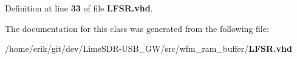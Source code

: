 Definition at line {\bf 33} of file {\bf L\+F\+S\+R.\+vhd}.



The documentation for this class was generated from the following file\+:\begin{DoxyCompactItemize}
\item 
/home/erik/git/dev/\+Lime\+S\+D\+R-\/\+U\+S\+B\+\_\+\+G\+W/src/wfm\+\_\+ram\+\_\+buffer/{\bf L\+F\+S\+R.\+vhd}\end{DoxyCompactItemize}
